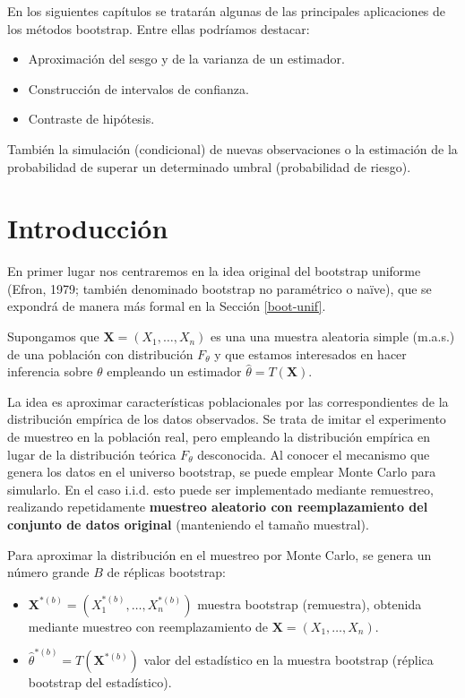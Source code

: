 \documentclass[
  spanish,
  10pt,
]{book}
\renewcommand{\mathbf}[1]{\symbf{#1}}
\theoremstyle{break}
\theoremstyle{nonumberplain}
\begin{document}
En los siguientes capítulos se tratarán algunas de las principales aplicaciones de los métodos bootstrap.
Entre ellas podríamos destacar:

\begin{itemize}
\item
  Aproximación del sesgo y de la varianza de un estimador.
\item
  Construcción de intervalos de confianza.
\item
  Contraste de hipótesis.
\end{itemize}

También la simulación (condicional) de nuevas observaciones o la estimación de la probabilidad de superar un determinado umbral (probabilidad de riesgo).

\section{Introducción}\label{boot-intro}

En primer lugar nos centraremos en la idea original del bootstrap uniforme (Efron, 1979; también denominado bootstrap no paramétrico o naïve), que se expondrá de manera más formal en la Sección \ref{boot-unif}.

Supongamos que \(\mathbf{X}=\left( X_1,\ldots ,X_n \right)\) es una una muestra aleatoria simple (m.a.s.)
de una población con distribución \(F_{\theta}\) y que estamos interesados en hacer inferencia sobre \(\theta\) empleando un estimador \(\hat{\theta} = T\left( \mathbf{X} \right)\).

La idea es aproximar características poblacionales por las correspondientes de la distribución empírica de los
datos observados.
Se trata de imitar el experimento de muestreo en la población real, pero empleando la distribución empírica en lugar de la distribución teórica \(F_{\theta}\) desconocida.
Al conocer el mecanismo que genera los datos en el universo bootstrap, se puede emplear Monte Carlo para simularlo.
En el caso i.i.d. esto puede ser implementado mediante remuestreo, realizando repetidamente \textbf{muestreo aleatorio con reemplazamiento del conjunto de datos original} (manteniendo el tamaño muestral).

Para aproximar la distribución en el muestreo por Monte Carlo, se genera un número grande \(B\) de réplicas bootstrap:

\begin{itemize}
\item
  \(\mathbf{X}^{\ast (b)}=\left( X_1^{\ast (b)},\ldots ,X_n^{\ast (b)} \right)\) muestra bootstrap (remuestra),
  obtenida mediante muestreo con reemplazamiento de \(\mathbf{X}=\left( X_1,\ldots ,X_n \right)\).
\item
  \(\hat{\theta}^{\ast (b)} = T\left( \mathbf{X}^{\ast (b)} \right)\)
  valor del estadístico en la muestra bootstrap (réplica bootstrap del estadístico).
\end{itemize}
\end{document}
